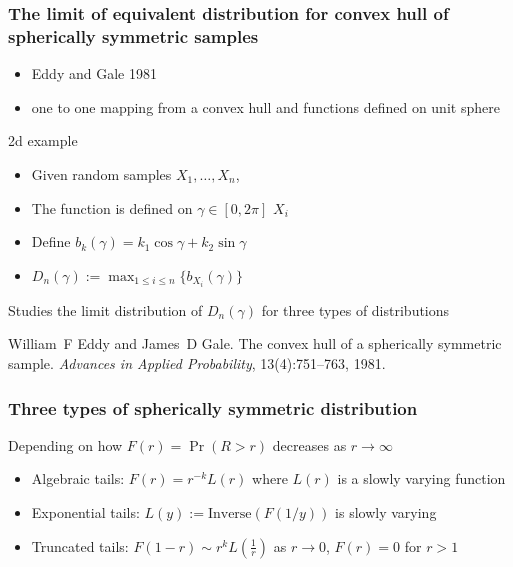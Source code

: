 \documentclass{beamer}
\begin{document}
\begin{frame}
    \frametitle{The limit of equivalent distribution for convex hull of spherically symmetric samples}
    \begin{itemize}
        \item Eddy and Gale 1981
        \item one to one mapping from a convex hull and functions defined on unit sphere
    \end{itemize}
    \begin{block}{2d example}
        \begin{itemize}
        \item Given random samples $X_1, \dots, X_n$,
        \item The function is defined on $\gamma \in [0,2\pi]$
        $X_i$
        \item Define $b_k(\gamma) =  k_1\cos\gamma + k_2 \sin \gamma$
        \item $D_n(\gamma):=\max_{1\leq i \leq n}\{b_{X_i}(\gamma)\}$
        \end{itemize}
    \end{block}
    Studies the limit distribution of $D_n(\gamma)$ for three types of distributions

    \footnotesize{William~F Eddy and James~D Gale.
     The convex hull of a spherically symmetric sample.
    {\em Advances in Applied Probability}, 13(4):751--763, 1981.
    }
\end{frame}
\begin{frame}
    \frametitle{Three types of spherically symmetric distribution}
    Depending on how $F(r)=\Pr(R>r)$ decreases as $r\to \infty$
    \begin{itemize}
        \item Algebraic tails: $F(r)= r^{-k} L(r)$ where $L(r)$ is a slowly varying function
        \item Exponential tails: $L(y):=\textrm{Inverse}(F(1/y))$ is slowly varying
        \item Truncated tails: $F(1-r) \sim r^k L(\frac{1}{r})$ as $r\to 0$, $F(r)=0$ for $r>1$
    \end{itemize}
\end{frame}
\end{document}
